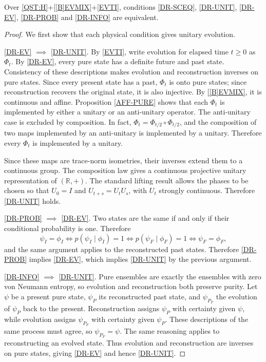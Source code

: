 \documentclass{techbrief}
\begin{document}
\begin{thrm}
	Over \ref{QST:H}+\ref{[B]EVMIX}+\ref{EVTI}, conditions \ref{DR-SCEQ}, \ref{DR-UNIT}, \ref{DR-EV}, \ref{DR-PROB} and \ref{DR-INFO} are equivalent.
\end{thrm}

\begin{proof}
	We first show that each physical condition gives unitary evolution.

	\ref{DR-EV} $\implies$ \ref{DR-UNIT}. By \ref{EVTI}, write evolution for elapsed time $t\geq0$ as $\Phi_t$. By \ref{DR-EV}, every pure state has a definite future and past state. Consistency of these descriptions makes evolution and reconstruction inverses on pure states. Since every present state has a past, $\Phi_t$ is onto pure states; since reconstruction recovers the original state, it is also injective. By \ref{[B]EVMIX}, it is continuous and affine. Proposition \ref{AFF-PURE} shows that each $\Phi_t$ is implemented by either a unitary or an anti-unitary operator. The anti-unitary case is excluded by composition. In fact, $\Phi_t=\Phi_{t/2}\circ \Phi_{t/2}$, and the composition of two maps implemented by an anti-unitary is implemented by a unitary. Therefore every $\Phi_t$ is implemented by a unitary.

	Since these maps are trace-norm isometries, their inverses extend them to a continuous group. The composition law gives a continuous projective unitary representation of $(\mathbb{R},+)$. The standard lifting result \cite[Theorem~5.59]{Landsman2017} allows the phases to be chosen so that $U_0=I$ and $U_{t+s}=U_tU_s$, with $U_t$ strongly continuous. Therefore \ref{DR-UNIT} holds.

	\ref{DR-PROB} $\implies$ \ref{DR-EV}. Two states are the same if and only if their conditional probability is one. Therefore
	\begin{equation}
		\psi_I=\phi_I
		\iff p(\psi_I\mid\phi_I)=1
		\iff p(\psi_F\mid\phi_F)=1
		\iff \psi_F=\phi_F,
	\end{equation}
	and the same argument applies to the reconstructed past states. Therefore \ref{DR-PROB} implies \ref{DR-EV}, which implies \ref{DR-UNIT} by the previous argument.

	\ref{DR-INFO} $\implies$ \ref{DR-UNIT}. Pure ensembles are exactly the ensembles with zero von Neumann entropy, so evolution and reconstruction both preserve purity. Let $\psi$ be a present pure state, $\psi_P$ its reconstructed past state, and $\psi_{P_F}$ the evolution of $\psi_P$ back to the present. Reconstruction assigns $\psi_P$ with certainty given $\psi$, while evolution assigns $\psi_{P_F}$ with certainty given $\psi_P$. These descriptions of the same process must agree, so $\psi_{P_F}=\psi$. The same reasoning applies to reconstructing an evolved state. Thus evolution and reconstruction are inverses on pure states, giving \ref{DR-EV} and hence \ref{DR-UNIT}.


\end{proof}
\end{document}
